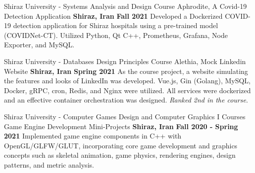\begin{cventries}
      \cventry
        {Shiraz University - Systems Analysis and Design Course} %
        {Aphrodite, A Covid-19 Detection Application} %
        {\textbf{Shiraz, Iran}} %
        {\textbf{Fall 2021}} %
        {
            Developed a Dockerized COVID-19 detection application for Shiraz hospitals using a pre-trained model (COVIDNet-CT). Utilized Python, Qt C++, Prometheus, Grafana, Node Exporter, and MySQL.
        }

  \cventry
    {Shiraz University - Databases Design Principles Course} %
    {Alethia, Mock Linkedin Website} %
    {\textbf{Shiraz, Iran}} %
    {\textbf{Spring 2021}} %
    {
      As the course project, a website simulating the features and looks of LinkedIn was developed. Vue.js, Gin (Golang), MySQL, Docker, gRPC, cron, Redis, and Nginx were utilized. All services were dockerized and an effective container orchestration was designed. \emph{Ranked 2nd in the course}.
    }

  \cventry
    {Shiraz University - Computer Games Design and Computer Graphics I Courses} %
    {Game Engine Development Mini-Projects} %
    {\textbf{Shiraz, Iran}} %
    {\textbf{Fall 2020 - Spring 2021}} %
    {
        Implemented game engine components in C++ with OpenGL/GLFW/GLUT, incorporating core game development and graphics concepts such as skeletal animation, game physics, rendering engines, design patterns, and metric analysis.
    }





\end{cventries}
